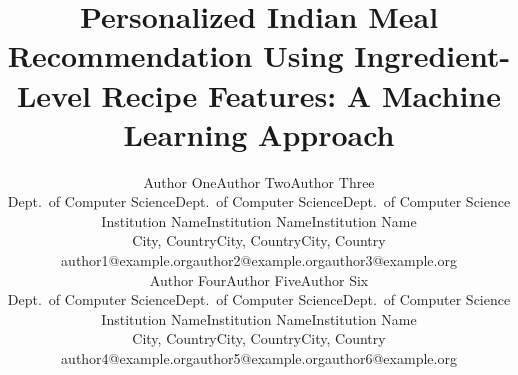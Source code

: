 \documentclass[conference]{IEEEtran}
\begin{document}
\title{Personalized Indian Meal Recommendation Using Ingredient-Level Recipe
Features: A Machine Learning Approach}

\author{%
\begin{tabular}{@{}c@{\hspace{0.55cm}}c@{\hspace{0.55cm}}c@{}}
{\normalsize Author One} & {\normalsize Author Two} & {\normalsize Author Three} \\[2pt]
{\footnotesize Dept.\ of Computer Science} & {\footnotesize Dept.\ of Computer Science} & {\footnotesize Dept.\ of Computer Science} \\
{\footnotesize Institution Name} & {\footnotesize Institution Name} & {\footnotesize Institution Name} \\
{\footnotesize City, Country} & {\footnotesize City, Country} & {\footnotesize City, Country} \\
{\footnotesize author1@example.org} & {\footnotesize author2@example.org} & {\footnotesize author3@example.org} \\[9pt]
{\normalsize Author Four} & {\normalsize Author Five} & {\normalsize Author Six} \\[2pt]
{\footnotesize Dept.\ of Computer Science} & {\footnotesize Dept.\ of Computer Science} & {\footnotesize Dept.\ of Computer Science} \\
{\footnotesize Institution Name} & {\footnotesize Institution Name} & {\footnotesize Institution Name} \\
{\footnotesize City, Country} & {\footnotesize City, Country} & {\footnotesize City, Country} \\
{\footnotesize author4@example.org} & {\footnotesize author5@example.org} & {\footnotesize author6@example.org} \\
\end{tabular}}

\maketitle
\end{document}
